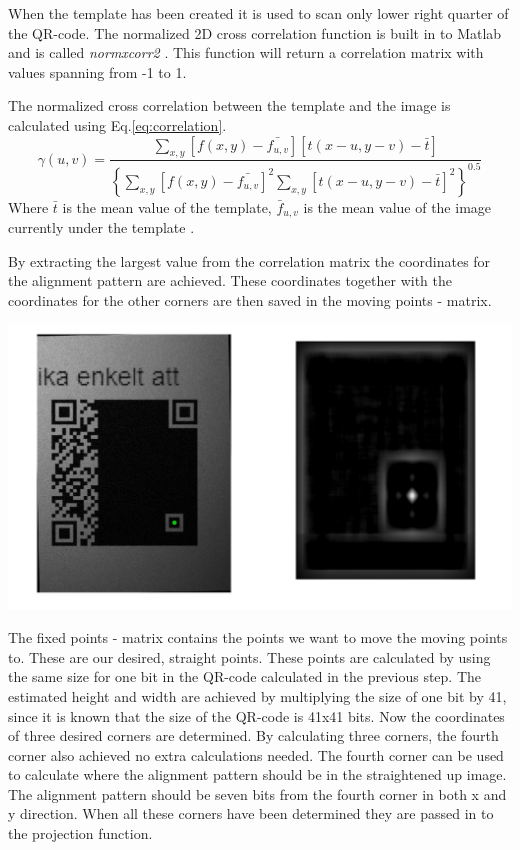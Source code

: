 \documentclass[12pt,a4paper]{article}
\newenvironment{Figure}
  {\par\medskip\noindent\minipage{\linewidth}}
  {\endminipage\par\medskip}
\begin{document}
When the template has been created it is used to scan only lower right quarter of the QR-code. The normalized 2D cross correlation function is built in to Matlab and is called \textit{normxcorr2} \cite{normxcorr}. This function will return a correlation matrix with values spanning from -1 to 1. 

The normalized cross correlation between the template and the image is calculated using Eq.\ref{eq:correlation}.
\begin{equation}\label{eq:correlation}
	\gamma(u,v)=\frac{\sum_{x,y} [f(x,y)-\bar{f_{u,v}}][t(x-u,y-v)-\bar{t}]}{\left \{ \sum_{x,y}[f(x,y)-\bar{f_{u,v}}]^2\sum_{x,y}[t(x-u,y-v)-\bar{t}]^2   \right \}^{0.5}}
\end{equation}
Where $\bar{t}$ is the mean value of the template, $\bar{f}_{u,v}$ is the mean value of the image currently under the template \cite{lewisfast}. 

By extracting the largest value from the correlation matrix the coordinates for the alignment pattern are achieved. These coordinates together with the coordinates for the other corners are then saved in the moving points - matrix. 
\begin{Figure}
  \centering
    \includegraphics[width=1\linewidth]{./img/correlation.png}
\end{Figure}

The fixed points - matrix contains the points we want to move the moving points to. These are our desired, straight points. These points are calculated by using the same size for one bit in the QR-code calculated in the previous step. The estimated height and width are achieved by multiplying the size of one bit by 41, since it is known that the size of the QR-code is 41x41 bits. Now the coordinates of three desired corners are determined. By calculating three corners, the fourth corner also achieved no extra calculations needed. The fourth corner can be used to calculate where the alignment pattern should be in the straightened up image. The alignment pattern should be seven bits from the fourth corner in both x and y direction. When all these corners have been determined they are passed in to the projection function. 
\end{document}
